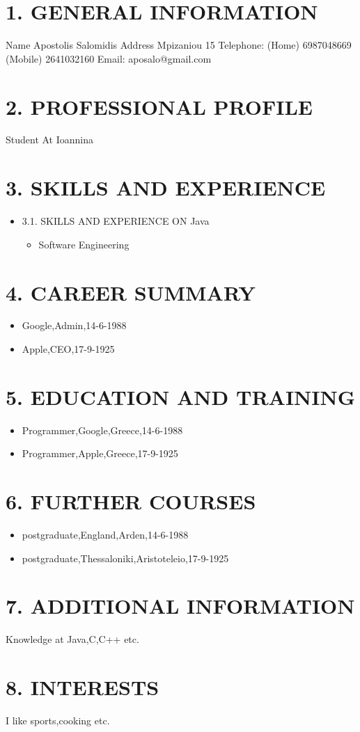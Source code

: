 \documentclass[10pt]{article}
\date{}
\begin{document}
\section*{1.	GENERAL INFORMATION}
Name Apostolis Salomidis
Address Mpizaniou 15
Telephone: (Home) 6987048669 (Mobile) 2641032160
Email: aposalo@gmail.com
\section*{2.	PROFESSIONAL PROFILE}
		Student At Ioannina
\section*{3.	SKILLS AND EXPERIENCE}
\begin{itemize}
	\item 3.1.	SKILLS AND EXPERIENCE ON Java
\begin{itemize}
			\item Software Engineering
\end{itemize}
\end{itemize}
\section*{4.	CAREER SUMMARY}\begin{itemize}
		\item Google,Admin,14-6-1988
		\item Apple,CEO,17-9-1925
\end{itemize}
\section*{5.	EDUCATION AND TRAINING}
\begin{itemize}
		\item Programmer,Google,Greece,14-6-1988
		\item Programmer,Apple,Greece,17-9-1925
\end{itemize}
\section*{6.	FURTHER COURSES}
\begin{itemize}
		\item postgraduate,England,Arden,14-6-1988
		\item postgraduate,Thessaloniki,Aristoteleio,17-9-1925
\end{itemize}
\section*{7.	ADDITIONAL INFORMATION}
		Knowledge at Java,C,C++ etc.
\section*{8.	INTERESTS}
		I like sports,cooking etc.
\end{document}
